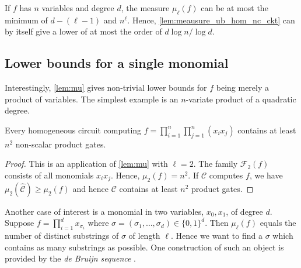 \documentclass[11pt]{article}
\newcommand{\ckt}{\textbf{$\mathcal{C}$}}
\renewcommand{\fam}{\textbf{$\mathcal{F}$}}
\begin{document}
\begin{remark} 
  If $f$ has $n$ variables and degree $d$, the measure $\mu_\ell(f)$ can be at most the minimum of $d- (\ell-1)$ and $n^\ell$. 
  Hence, \autoref{lem:meausure_ub_hom_nc_ckt} can by itself give a lower of at most the order of $d\log n/\log d$. %
\end{remark}


\subsection{Lower bounds for a single monomial}\label{sec:monomial}
Interestingly, \autoref{lem:mu} gives non-trivial lower bounds for $f$ being merely a product of variables. 
The simplest example is an $n$-variate product of a quadratic degree.

\begin{proposition} 
  Every homogeneous circuit computing $f=\prod_{i=1}^n\prod_{j=1}^n (x_ix_j)$ contains at least $n^2$ non-scalar product gates. 
\end{proposition}

\begin{proof} 
  This is an application of \autoref{lem:mu} with $\ell=2$. 
  The family $\fam_2(f)$ consists of all monomials $x_ix_j$. 
  Hence, $\mu_2(f)=n^2$. If $\ckt$ computes $f$, we have $\mu_2(\widehat {\ckt})\geq \mu_2(f)$ and hence $\ckt$ contains at least $n^2$ product gates.
\end{proof}

Another case of interest is a monomial in two variables, $x_0,x_1$, of degree $d$. 
Suppose $f= \prod_{i=1}^d x_{\sigma_i} $ where $\sigma= ( \sigma_1,\dots, \sigma_d)\in \{0,1\}^d $. 
Then $\mu_\ell(f)$ equals the number of distinct substrings of $\sigma$ of length $\ell$. 
Hence we want to find a $\sigma$ which contains as many substrings as possible. 
One construction of such an object is provided by the \emph{de Bruijn sequence} \cite{dB46}.
\end{document}
